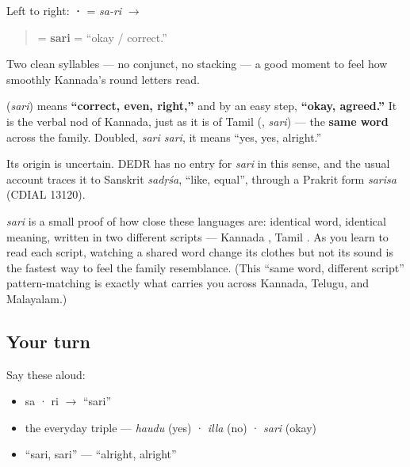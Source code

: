 Left to right: \textbf{ · } = \emph{sa-ri} $\to$

\begin{quote}
\textbf{} = \textbf{sari} = \textquotedblleft{}okay / correct.\textquotedblright{}
\end{quote}

Two clean syllables — no conjunct, no stacking — a good moment to feel how smoothly Kannada's round letters read.

\begin{cousinweb}
\textbf{} (\emph{sari}) means \textbf{\textquotedblleft{}correct, even, right,\textquotedblright{}} and by an easy step, \textbf{\textquotedblleft{}okay, agreed.\textquotedblright{}} It is the verbal nod of Kannada, just as it is of Tamil (\textbf{}, \emph{sari}) — the \textbf{same word} across the family. Doubled, \emph{sari sari}, it means \textquotedblleft{}yes, yes, alright.\textquotedblright{}

Its origin is uncertain. DEDR has no entry for \emph{sari} in this sense, and the usual account traces it to Sanskrit \emph{sadṛśa}, \textquotedblleft{}like, equal\textquotedblright{}, through a Prakrit form \emph{sarisa} (CDIAL 13120).
\end{cousinweb}

\begin{grammarlens}[title={Grammar Lens: one shared Dravidian word, two scripts}]
\emph{sari} is a small proof of how close these languages are: identical word, identical meaning, written in two different scripts — Kannada \textbf{}, Tamil \textbf{}. As you learn to read each script, watching a shared word change its clothes but not its sound is the fastest way to feel the family resemblance. (This \textquotedblleft{}same word, different script\textquotedblright{} pattern-matching is exactly what carries you across Kannada, Telugu, and Malayalam.)
\end{grammarlens}

\subsection*{Your turn}
Say these aloud:

\begin{itemize}
\raggedright
  \item sa · ri $\to$ \textquotedblleft{}sari\textquotedblright{}
  \item the everyday triple — \emph{haudu} (yes) · \emph{illa} (no) · \emph{sari} (okay)
  \item \textquotedblleft{}sari, sari\textquotedblright{} — \textquotedblleft{}alright, alright\textquotedblright{}
\end{itemize}

